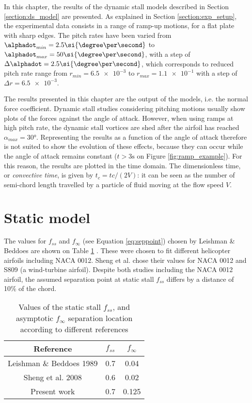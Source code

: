 In this chapter, the results of the dynamic stall models described in Section \ref{section:ds_model} are presented. As explained in Section \ref{section:exp_setup}, the experimental data consists in a range of ramp-up motions, for a flat plate with sharp edges. The pitch rates have been varied from $\alphadot_{min} = 2.5 \si{\degree \per \second}$ to $\alphadot_{max} = 50 \si{\degree \per \second}$, with a step of $\Delta \alphadot = 2.5 \si{\degree \per \second}$, which corresponds to reduced pitch rate range from $r_{min} = \num{6.5e-3}$ to $r_{max}=\num{1.1e-1}$ with a step of $\Delta r = \num{6.5e-3}$. 

The results presented in this chapter are the output of the models, i.e. the normal force coefficient. Dynamic stall studies considering pitching motions usually show plots of the forces against the angle of attack. However, when using ramps at high pitch rate, the dynamic stall vortices are shed after the airfoil has reached $\alpha_{max}=\ang{30}$. 
Representing the results as a function of the angle of attack therefore is not suited to show the evolution of these effects, because they can occur while the angle of attack remains constant ($t>3 \si{\second}$ on Figure \ref{fig:ramp_example}). For this reason, the results are plotted in the time domain. The dimensionless time, or \textit{convective time}, is given by $t_c = t c /(2V)$: it can be seen as the number of semi-chord length travelled by a particle of fluid moving at the flow speed $V$.

\section{Static model}

The values for $f_{ss}$ and $f_{\infty}$ (see Equation \ref{eq:seppoint}) chosen by Leishman \& Beddoes \cite{leishman_semi-empirical_1989} are shown on Table \ref{table:seppoint_params} . These were chosen to fit different helicopter airfoils including NACA 0012. Sheng et al. \cite{sheng_modified_2008} chose their values for NACA 0012 and S809 (a wind-turbine airfoil). Despite both studies including the NACA 0012 airfoil, the assumed separation point at static stall $f_{ss}$ differs by a distance of 10\% of the chord. 

\begin{table}
	\centering
	\begin{tabular}{|c|c|c|}
	\hline
	Reference & $f_{ss}$ & $f_\infty $ \\
	\hline
	Leishman \& Beddoes 1989 \cite{leishman_semi-empirical_1989} & 0.7 & 0.04 \\
	Sheng et al. 2008  \cite{sheng_modified_2008} & 0.6 & 0.02 \\
	Present work & 0.7 & 0.125 \\
	\hline
	\end{tabular}
	\caption{Values of the static stall $f_{ss}$, and asymptotic $f_\infty$ separation location according to different references}
	\label{table:seppoint_params}	
\end{table}


